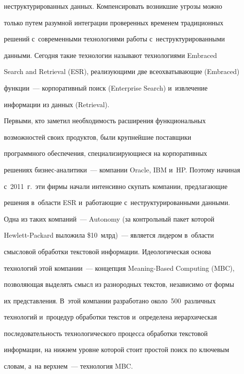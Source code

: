 неструктурированных данных. Компенсировать возникшие угрозы можно 


только путем разумной интеграции проверенных временем традиционных 


решений с~современными технологиями работы с~неструктурированными 


данными. Сегодня такие технологии называют технологиями Embraced 


Search and Retrieval (ESR), реализующими две всеохватывающие (Embraced) 


функции~--- корпоративный поиск (Enterprise Search) и~извлечение 


информации из данных (Retrieval). 


     


     Первыми, кто заметил необходимость расширения функциональных 


возможностей своих продуктов, были крупнейшие поставщики 


программного обеспечения, специализирующиеся на корпоративных 


решениях биз\-нес-ана\-ли\-ти\-ки~--- компании Oracle, IBM и~HP. Поэтому начиная 


с~2011~г.\ эти фирмы начали интенсив\-но скупать компании, предлагающие 


решения в~области ESR и~работающие с~неструктурированными данными. 


Одна из таких компаний~--- Autonomy (за контрольный пакет которой 


Hewlett-Packard выложила \$10~млрд)~--- является лидером в~области 


смысловой обработки текстовой информации. Идеологическая основа 


технологий этой компании~--- концепция Meaning-Based Computing (MBC), 


позволяющая выделять смысл из разнородных текстов, независимо от формы 


их представления. В~этой компании разработано около~500~различных 


технологий и~процедур обработки текстов и~определена иерархическая 


последовательность технологического процесса обработки текстовой 


информации, на нижнем уровне которой стоит простой поиск по ключевым 


словам, а~на верхнем~--- технология MBC.


